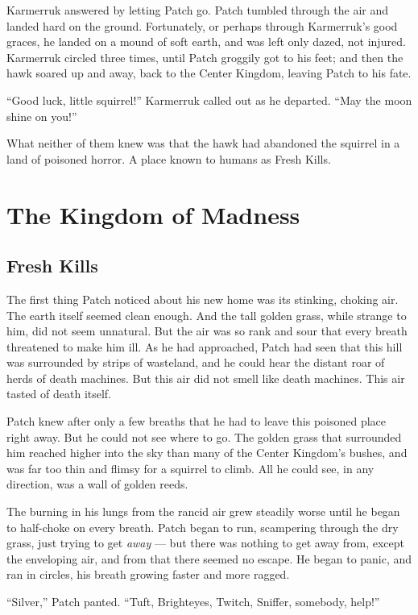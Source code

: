 \documentclass[ebook,oneside,openany,17pt]{memoir}
\newenvironment{tolerant}[1]{%
  \par\tolerance=#1\relax
}{%
  \par
}
\renewcommand{\thechapter}{\Roman{chapter}}
\newcounter{sections}
\newcommand{\sections}[1]{%
  \section*{#1}
  \addtocounter{sections}{1}%
  \pdfbookmark[1]{#1}{section.\thechapter.\thesections}}
\begin{document}
Karmerruk answered by letting Patch go. Patch tumbled through the air
and landed hard on the ground. Fortunately, or perhaps through
Karmerruk’s good graces, he landed on a mound of soft earth, and was
left only dazed, not injured. Karmerruk circled three times, until
Patch groggily got to his feet; and then the hawk soared up and away,
back to the Center Kingdom, leaving Patch to his fate.

“Good luck, little squirrel!” Karmerruk called out as he
departed. “May the moon shine on you!”

What neither of them knew was that the hawk had abandoned the squirrel
in a land of poisoned horror. A place known to humans as Fresh Kills.



\chapter{The Kingdom of Madness}

\sections{Fresh Kills}

\begin{tolerant}{5000}
The first thing Patch noticed about his new home was its stinking,
choking air. The earth itself seemed clean enough. And the tall golden
grass, while strange to him, did not seem unnatural. But the air was
so rank and sour that every breath threatened to make him ill. As he
had approached, Patch had seen that this hill was surrounded by strips
of wasteland, and he could hear the distant roar of herds of death
machines. But this air did not smell like death machines. This air
tasted of death itself.
\end{tolerant}

Patch knew after only a few breaths that he had to leave this poisoned
place right away. But he could not see where to go. The golden grass
that surround\-ed him reached higher into the sky than many of the
Center Kingdom’s bushes, and was far too thin and flimsy for a
squirrel to climb. All he could see, in any direction, was a wall of
golden reeds.

The burning in his lungs from the rancid air grew steadily worse until
he began to half-choke on every breath. Patch began to run, scampering
through the dry grass, just trying to get \emph{away} — but there
was nothing to get away from, except the enveloping air, and from that
there seemed no escape. He began to panic, and ran in circles, his
breath growing faster and more ragged.

“Silver,” Patch panted. “Tuft, Brighteyes, Twitch, Sniffer, somebody,
help!”
\end{document}
